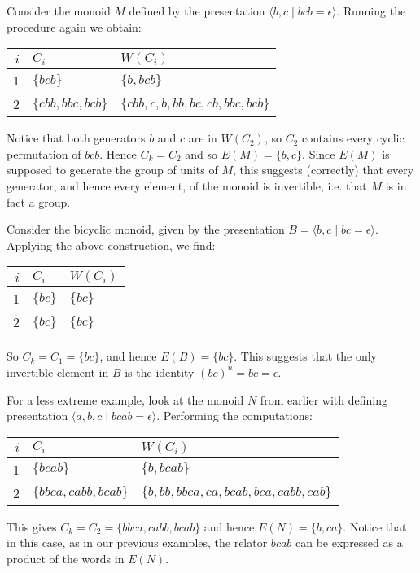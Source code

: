 \documentclass[showlabels,noindex,12pt]{lmaths}
\begin{document}
\begin{example} \label{ex:Ck-group}
	Consider the monoid $M$ defined by the presentation $\langle b, c \mid bcb = \epsilon \rangle$. Running the procedure again we obtain:

	\begin{center}
	\renewcommand{\arraystretch}{1.2}
	\begin{tabular}{r|ll}
		$i$ & $C_i$ & $W(C_i)$ \\ \hline
		1 & $\{bcb\}$ & $\{b, bcb\}$ \\
		2 & $\{cbb, bbc, bcb\}$ & $\{cbb, c, b, bb, bc, cb, bbc, bcb\}$
	\end{tabular}
	\end{center}

	Notice that both generators $b$ and $c$ are in $W(C_2)$, so $C_2$ contains every cyclic permutation of $bcb$. Hence $C_k = C_2$ and so $E(M) = \{ b, c\}$. Since $E(M)$ is supposed to generate the group of units of $M$, this suggests (correctly) that every generator, and hence every element, of the monoid is invertible, i.e. that $M$ is in fact a group. 
\end{example}

\begin{example}
	Consider the bicyclic monoid, given by the presentation $B = \langle b, c \mid bc = \epsilon \rangle$.
	Applying the above construction, we find:

	\begin{center}
	\renewcommand{\arraystretch}{1.2}
	\begin{tabular}{r|ll}
		$i$ & $C_i$ & $W(C_i)$ \\ \hline
		1 & $\{bc\}$ & $\{bc\}$ \\
		2 & $\{bc\}$ & $\{bc\}$
	\end{tabular}
	\end{center}

	So $C_k = C_1 = \{ bc \}$, and hence $E(B) = \{bc\}$. This suggests that the only invertible element in $B$ is the identity $(bc)^n = bc = \epsilon$.
\end{example}

\begin{example} \label{ex:monoidN}
	For a less extreme example, look at the monoid $N$ from earlier with defining presentation $\langle a, b, c \mid bcab = \epsilon\rangle$. Performing the computations:

	\begin{center}
	\renewcommand{\arraystretch}{1.2}
	\begin{tabular}{r|ll}
		$i$ & $C_i$ & $W(C_i)$ \\ \hline
		1 & $\{bcab\}$ & $\{b, bcab\}$ \\
		2 & $\{bbca, cabb, bcab\}$ & $\{b, bb, bbca, ca, bcab, bca, cabb, cab\}$
	\end{tabular}
	\end{center}

	This gives $C_k = C_2 = \{bbca, cabb, bcab\}$ and hence $E(N) = \{b, ca\}$. Notice that in this case, as in our previous examples, the relator $bcab$ can be expressed as a product of the words in $E(N)$.

\end{example}
\end{document}
